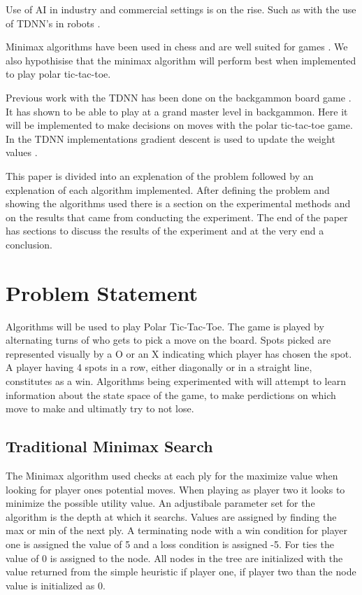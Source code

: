 \documentclass[12pt,letterpaper]{article}
\begin{document}
Use of AI in industry and commercial settings is on the rise. Such as with the use of TDNN's in robots 
\cite{robotTDNN}.
 
Minimax algorithms have been used in chess and are well suited for games \cite{flyingMinimax}. We also hypothisise that the minimax algorithm will perform best when implemented to play polar tic-tac-toe.

Previous work with the TDNN has been done on the backgammon board game \cite{stanfordTDNN}. It has shown to be able to play at a grand master level in backgammon. Here it will be implemented to make decisions on moves with the polar tic-tac-toe game. In the TDNN implementations gradient descent is used to update the weight values \cite{gradientTDNN}.

This paper is divided into an explenation of the problem followed by an explenation of each algorithm implemented. After defining the problem and showing the algorithms used there is a section on the experimental methods and on the results that came from conducting the experiment. The end of the paper has sections to discuss the results of the experiment and at the very end a conclusion.


\section{Problem Statement}
Algorithms will be used to play Polar Tic-Tac-Toe. The game is played by alternating turns of who gets to pick a move on the board. Spots picked are represented visually by a O or an X indicating which player has chosen the spot. A player having 4 spots in a row, either diagonally or in a straight line, constitutes as a win. Algorithms being experimented with will attempt to learn information about the state space of the game, to make perdictions on which move to make and ultimatly try to not lose.

\subsection{Traditional Minimax Search}
The Minimax algorithm used checks at each ply for the maximize value when looking for player ones potential moves. When playing as player two it looks to minimize the possible utility value. An adjustibale parameter set for the algorithm is the depth at which it searchs. Values are assigned by finding the max or min of the next ply. A terminating node with a win condition for player one is assigned the value of 5 and a loss condition is assigned -5. For ties the value of 0 is assigned to the node. All nodes in the tree are initialized with the value returned from the simple heuristic if player one, if player two than the node value is initialized as 0. 
\end{document}
